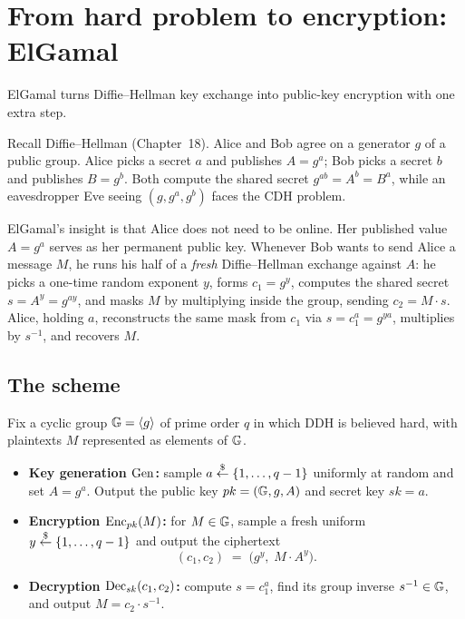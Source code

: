\section{From hard problem to encryption: ElGamal}
\label{ch20:elgamal}

ElGamal turns Diffie--Hellman key exchange into public-key encryption with one extra step.

\begin{intuitionbox}
Recall Diffie--Hellman (Chapter~18). Alice and Bob agree on a generator $g$ of a public group. Alice picks a secret $a$ and
publishes $A = g^a$; Bob picks a secret $b$ and publishes $B = g^b$. Both compute the shared secret
$g^{ab} = A^b = B^a$, while an eavesdropper Eve seeing $(g, g^a, g^b)$ faces the CDH problem.

ElGamal's insight is that Alice does not need to be online. Her published value $A = g^a$ serves as her permanent public
key. Whenever Bob wants to send Alice a message $M$, he runs his half of a
\emph{fresh} Diffie--Hellman exchange against $A$: he picks a one-time random exponent $y$, forms $c_1 = g^y$, computes the
shared secret $s = A^y = g^{ay}$, and masks $M$ by multiplying inside the group, sending
$c_2 = M \cdot s$. Alice, holding $a$, reconstructs the same mask from $c_1$ via
$s = c_1^{a} = g^{ya}$, multiplies by $s^{-1}$, and recovers $M$.
\end{intuitionbox}

\subsection{The scheme}

\begin{definition}
\label{ch20:def-elgamal}
Fix a cyclic group $\mathbb{G} = \langle g \rangle$ of prime order $q$ in which DDH is believed hard, with plaintexts $M$ represented as elements of $\mathbb{G}$.
\begin{itemize}
  \item \textbf{Key generation $\operatorname{Gen}$:} sample $a \stackrel{\$}{\gets} \{1,\dots,q-1\}$ uniformly at random and set $A = g^{a}$. Output the public
    key $pk = (\mathbb{G}, g, A)$ and secret key $sk = a$.
  \item \textbf{Encryption $\operatorname{Enc}_{pk}(M)$:} for $M \in \mathbb{G}$, sample a fresh uniform $y \stackrel{\$}{\gets} \{1,\dots,q-1\}$ and output the
    ciphertext
    \[
      (c_1, c_2) \;=\; \bigl(g^{y},\; M \cdot A^{y}\bigr).
    \]
  \item \textbf{Decryption $\operatorname{Dec}_{sk}(c_1, c_2)$:} compute $s = c_1^{a}$, find its group inverse $s^{-1} \in \mathbb{G}$, and output
    $M = c_2 \cdot s^{-1}$.
\end{itemize}
\end{definition}

